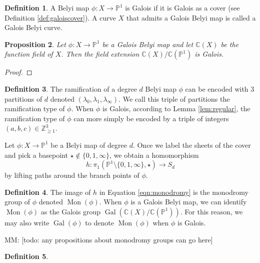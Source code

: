 \documentclass{dcthesis}
\newcommand{\PP}{\mathbb P}
\newcommand{\CC}{\mathbb C}
\newcommand{\ZZ}{\mathbb Z}
\newcommand{\defi}[1]{\textsf{#1}}
\newcommand{\mm}[1]{{\color{blue} \sf MM: [#1]}}
\DeclareMathOperator{\Mon}{Mon}
\DeclareMathOperator{\Gal}{Gal}
\newtheorem{prop}{Proposition}[section]
\theoremstyle{definition}
\newtheorem{definition}[prop]{Definition}
\theoremstyle{remark}
\numberwithin{equation}{section}
\numberwithin{figure}{section}
\begin{document}
{{{      \begin{definition}\label{def:galoisbelyi}
        A Belyi map $\phi\colon X\to\PP^1$
        is \defi{Galois}
        if it is Galois as a cover
        (see Definition \ref{def:galoiscover}).
        A curve $X$ that admits a Galois Belyi map
        is called a \defi{Galois Belyi curve}.
      \end{definition}
      \begin{prop}\label{prop:galoiscover}
        Let $\phi\colon X\to\PP^1$ be a Galois Belyi map
        and let $\CC(X)$ be the function field of $X$.
        Then the field extension
        $\CC(X)/\CC(\PP^1)$ is Galois.
      \end{prop}
      \begin{proof}
      \end{proof}
      \begin{definition}\label{def:ramificationtype}
        The ramification
        of a degree $d$ Belyi map $\phi$
        can be encoded with $3$ partitions of $d$
        denoted $(\lambda_0,\lambda_1,\lambda_\infty)$.
        We call this triple of partitions
        the \defi{ramification type} of $\phi$.
        When $\phi$ is Galois,
        according to Lemma \ref{lem:regular},
        the ramification type of $\phi$ can more simply be encoded by
        a triple of integers $(a,b,c)\in\ZZ_{\geq 1}^3$.
      \end{definition}
      Let $\phi\colon X\to\PP^1$ be a Belyi map of degree $d$.
      Once we label the sheets of the cover
      and pick a basepoint $\star\not\in\{0,1,\infty\}$,
      we obtain a homomorphism
      \begin{equation}\label{eqn:monodromy}
        h\colon\pi_1(\PP^1\setminus\{0,1,\infty\},\star)\to S_d
      \end{equation}
      by lifting paths around the branch points of $\phi$.
      \begin{definition}\label{def:monodromy}
        The image of $h$ in Equation \ref{eqn:monodromy}
        is the \defi{monodromy group} of $\phi$
        denoted $\Mon(\phi)$.
        When $\phi$ is a Galois Belyi map,
        we can identify $\Mon(\phi)$
        as the Galois group
        $\Gal(\CC(X)/\CC(\PP^1))$.
        For this reason,
        we may also write $\Gal(\phi)$
        to denote $\Mon(\phi)$ when $\phi$
        is Galois.
      \end{definition}
      \mm{todo: any propositions about monodromy groups can go here}
      \begin{definition}\label{def:Gbelyi}

\end{definition}}}}
\end{document}
